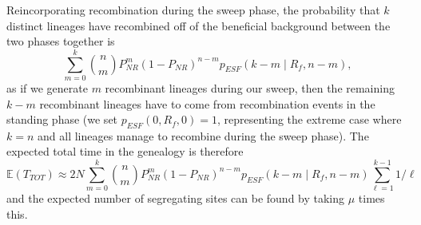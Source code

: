 \documentclass[a4paper,10pt]{article}
\begin{document}
Reincorporating recombination during the sweep phase, the probability that $k$ distinct lineages have recombined off of the beneficial background between the two phases together is
\begin{equation}
	\sum_{m=0}^{k} {n \choose m} P_{NR}^{m} (1-P_{NR})^{n-m} p_{ESF}\left(k-m\mid R_f, n-m\right),
\end{equation}
as if we generate $m$ recombinant lineages during our sweep, then the remaining $k-m$ recombinant lineages have to come from recombination events in the standing phase (we set $p_{ESF}\left(0,R_f,0\right)=1$, representing the extreme case where $k=n$ and all lineages manage to recombine during the sweep phase). The expected total time in the genealogy is therefore
\begin{equation}
\mathbb{E}(T_{TOT})  \approx 2N\sum_{m=0}^{k} {n \choose m} P_{NR}^{m} (1-P_{NR})^{n-m} p_{ESF}\left(k-m\mid R_f, n-m\right)   \sum_{\ell=1}^{k-1} 1/\ell
\end{equation}
and the expected number of segregating sites can be found by taking $\mu$ times this. 
\end{document}

